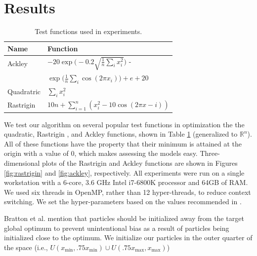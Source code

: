 \section{Results}\label{sec:results}
\begin{table}
  \centering
  \caption{Test functions used in experiments.}\label{tab:functions}
  \begin{tabular}{ll}\toprule
    \textbf{Name} & \textbf{Function}\\\midrule
    Ackley & $-20\exp\Big(-0.2\sqrt{\frac{1}{n}\sum_ix_i^2}\Big)$ -\\
    & \hspace{5mm} $\exp\Big(\frac{1}{n}\sum_i\cos(2\pi x_i)\Big) + e + 20$\\
    Quadratric & $\sum_i x_i^2$\\
    Rastrigin & $10n + \sum_{i=1}^n(x_i^2 - 10\cos(2\pi x - i))$\\\bottomrule
  \end{tabular}
\end{table}
We test our algorithm on several popular test functions in optimization
\cite{testprobs} the the quadratic, Rastrigin
\cite{rastrigin}, and Ackley \cite{ackley} functions, shown in Table
\ref{tab:functions} (generalized to $\mathbb{R}^n$). All of these functions have
the property that their minimum is attained at the origin with a value of
$0$, which makes assessing the models easy. Three-dimensional plots of the
Rastrigin and Ackley functions are shown in Figures \ref{fig:rastrigin} and
\ref{fig:ackley}, respectively.
All experiments were run on a single
workstation with a 6-core, 3.6 GHz Intel i7-6800K processor and 64GB of RAM. We
used six threads in OpenMP, rather than 12 hyper-threads, to reduce context switching.
We set the hyper-parameters based on the values recommended in
\cite{pso-convergence, spso}.

% 
Bratton et al. \cite{spso} mention that particles should be initialized away
from the target global optimum to prevent unintentional bias as a result of
particles being initialized close to the optimum. We initialize our particles
in the outer quarter of the space
(i.e., $  U(x_{\min}, .75x_{\min}) \cup U(.75x_{\max}, x_{\max})$)


